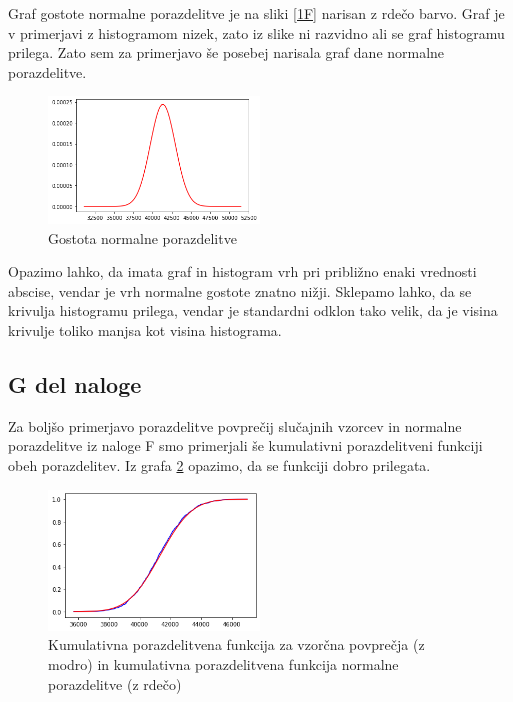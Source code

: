 \documentclass{article}
\begin{document}
Graf gostote normalne porazdelitve je na sliki \ref{1F} narisan z rdečo barvo. 
Graf je v primerjavi z histogramom nizek, zato iz slike ni razvidno ali se graf histogramu prilega.
Zato sem za primerjavo še posebej narisala graf dane normalne porazdelitve. 

\begin{figure}[H]
    \begin{center}
        \includegraphics*[width=0.5\textwidth]{figure1F(1).png}
        \caption{Gostota normalne porazdelitve}
        \label{1F*}
    \end{center}
\end{figure}
Opazimo lahko, da imata graf in histogram vrh pri približno enaki vrednosti abscise, vendar je vrh normalne 
gostote znatno nižji. Sklepamo lahko, da se krivulja histogramu prilega, vendar je standardni odklon tako velik,
da je visina krivulje toliko manjsa kot visina histograma.


\subsection{G del naloge}
Za boljšo primerjavo porazdelitve povprečij slučajnih vzorcev in normalne porazdelitve iz naloge F
smo primerjali še kumulativni porazdelitveni funkciji obeh porazdelitev.
Iz grafa \ref*{CDFpovprecja} opazimo, da se funkciji dobro prilegata.
\begin{figure}[H]
    \begin{center}
        \includegraphics*[width=0.5\textwidth]{figure1G.png}
        \caption{Kumulativna porazdelitvena funkcija za vzorčna povprečja (z modro) in kumulativna porazdelitvena funkcija normalne porazdelitve (z rdečo)}
        \label{CDFpovprecja}
    \end{center}
\end{figure}
\end{document}
